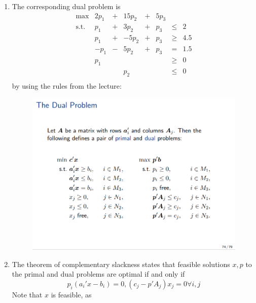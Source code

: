\documentclass{article}
\begin{document}
\begin{solving}
    \begin{enumerate}
        \item The corresponding dual problem is \begin{equation*}
            \begin{array}{crcrcrcr}
             \max & 2 p_1 & + & 15p_2 &+ & 5p_3\\
             \text{s.t.}&  p_1 & + & 3p_2 &+ & p_3 & \leq &2\\
             &  p_1 & + & -5p_2 &+ & p_3 & \geq &4.5\\
              &  -p_1 & - & 5p_2 &+ & p_3 & = &1.5\\
              & p_1 &  &  & & & \geq &0\\
              & &  &p_2   & & & \leq &0\\
        \end{array}
        \end{equation*}
        by using the rules from the lecture: \begin{figure}[H]
            \centering
            \includegraphics[scale = .5]{5/exercise/dual.png}
            \label{fig:my_label}
        \end{figure}
        \item The theorem of complementary slackness states that feasible solutions $x, p$ to the primal and dual problems are optimal if and only if \begin{equation*}
            p_i(a_i'x - b_i) = 0, (c_j-p'A_j)x_j = 0 \forall i, j
        \end{equation*}
        Note that $x$ is feasible, as \begin{equation*}
        \begin{array}{rcrcrcr}
             

\end{array}
\end{equation*}
\end{enumerate}
\end{solving}
\end{document}
